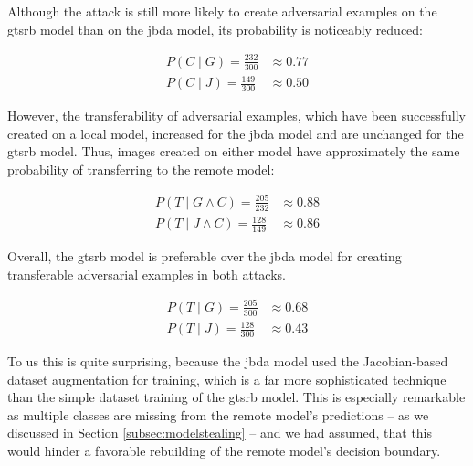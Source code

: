 Although the attack is still more likely to create adversarial examples on the gtsrb model than on the jbda model, its probability is noticeably reduced:

\begin{align*}
P(C \mid G) = \frac{232}{300} &\approx 0.77\\[1ex]
P(C \mid J) = \frac{149}{300} &\approx 0.50
\end{align*}

However, the transferability of adversarial examples, which have been successfully created on a local model, increased for the jbda model and are unchanged for the gtsrb model. Thus, images created on either model have approximately the same probability of transferring to the remote model:

\begin{align*}
P(T \mid G \wedge C) = \frac{205}{232} &\approx 0.88\\[1ex]
P(T \mid J \wedge C) = \frac{128}{149} &\approx 0.86
\end{align*}

Overall, the gtsrb model is preferable over the jbda model for creating transferable adversarial examples in both attacks. 

\begin{align*}
P(T \mid G) = \frac{205}{300} &\approx 0.68\\[1ex]
P(T \mid J) = \frac{128}{300} &\approx 0.43
\end{align*}

To us this is quite surprising, because the jbda model used the Jacobian-based dataset augmentation for training, which is a far more sophisticated technique than the simple dataset training of the gtsrb model. This is especially remarkable as multiple classes are missing from the remote model's predictions -- as we discussed in Section \ref{subsec:modelstealing} -- and we had assumed, that this would hinder a favorable rebuilding of the remote model's decision boundary.